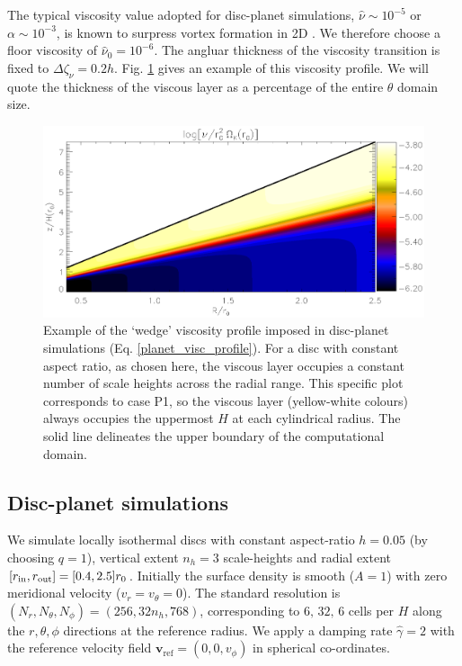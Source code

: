 The typical viscosity value adopted for disc-planet simulations, 
$\hat{\nu}\sim 10^{-5}$ or $\alpha\sim 10^{-3}$, is known to surpress
vortex formation in 2D \citep{valborro07, mudryk09}. 
We therefore choose a floor viscosity of $\hat{\nu}_0=10^{-6}$.
The angluar thickness of the viscosity transition is fixed to
$\Delta\zeta_\nu = 0.2h$. Fig. \ref{planet_visc2d} gives an example of this
viscosity profile. We will quote the thickness of the viscous layer as a 
percentage of the entire $\theta$ domain size. 

\begin{figure}
  \centering
  \includegraphics[width=\linewidth]{figures/pdisk_visc2d_planet}
  \caption{Example of the `wedge' viscosity profile
    imposed in disc-planet simulations
    (Eq. \ref{planet_visc_profile}).  
    For a disc with constant aspect ratio, as chosen here, the viscous
    layer occupies a constant number of scale heights across the
    radial range. This specific plot corresponds to case P1, so the
    viscous layer (yellow-white colours) always occupies the uppermost
    $H$ at each cylindrical radius. 
    The solid line
    delineates the upper boundary of the computational domain.
    \label{planet_visc2d}}
\end{figure}


\subsection{Disc-planet simulations} 
We simulate locally isothermal discs with constant aspect-ratio
$h=0.05$ (by choosing $q=1$), vertical extent $n_h=3$ scale-heights 
and radial extent $[r_\mathrm{in},r_\mathrm{out}]=[0.4,2.5]r_0$. Initially the surface density is smooth
($A=1$) with zero meridional velocity ($v_r=v_\theta=0$). 
The standard resolution is $(N_r, N_\theta,
N_\phi)=(256, 32n_h, 768)$, corresponding to $6,\,32,\,6$ 
cells per $H$ along the $r,\theta,\phi$ directions at the reference
radius. We apply a damping rate $\hat{\gamma}=2$ with the reference
velocity field $\bm{v}_\mathrm{ref}=(0,0,v_\phi)$ in spherical
co-ordinates.   

